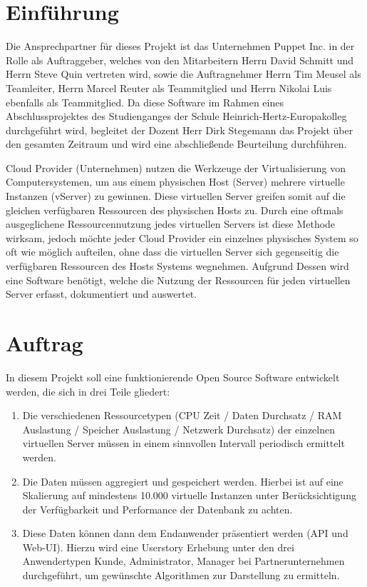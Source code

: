 \section{Einführung}

Die Ansprechpartner für dieses Projekt ist das Unternehmen Puppet Inc. in der
Rolle als Auftraggeber, welches von den Mitarbeitern Herrn David Schmitt und
Herrn Steve Quin vertreten wird, sowie die Auftragnehmer Herrn Tim Meusel als
Teamleiter, Herrn Marcel Reuter als Teammitglied und Herrn Nikolai Luis
ebenfalls als Teammitglied. Da diese Software im Rahmen eines
Abschlussprojektes des Studienganges der Schule Heinrich-Hertz-Europakolleg
durchgeführt wird, begleitet der Dozent Herr Dirk Stegemann das Projekt über
den gesamten Zeitraum und wird eine abschließende Beurteilung durchführen.

Cloud Provider (Unternehmen) nutzen die Werkzeuge der Virtualisierung von
Computersystemen, um aus einem physischen Host (Server) mehrere virtuelle
Instanzen (vServer) zu gewinnen. Diese virtuellen Server greifen somit auf die
gleichen verfügbaren Ressourcen des physischen Hosts zu. Durch eine oftmals
ausgeglichene Ressourcennutzung jedes virtuellen Servers ist diese Methode
wirksam, jedoch möchte jeder Cloud Provider ein einzelnes physisches System so
oft wie möglich aufteilen, ohne dass die virtuellen Server sich gegenseitig
die verfügbaren Ressourcen des Hosts Systems wegnehmen. Aufgrund Dessen wird
eine Software benötigt, welche die Nutzung der Ressourcen für jeden virtuellen
Server erfasst, dokumentiert und auswertet.


\section{Auftrag}

In diesem Projekt soll eine funktionierende Open Source Software entwickelt
werden, die sich in drei Teile gliedert:
\begin{enumerate}
  \item Die verschiedenen Ressourcetypen (CPU Zeit / Daten Durchsatz / RAM
    Auslastung / Speicher Auslastung / Netzwerk Durchsatz) der einzelnen
    virtuellen Server müssen in einem sinnvollen Intervall periodisch
    ermittelt werden.
  \item Die Daten müssen aggregiert und gespeichert werden. Hierbei ist auf
    eine Skalierung auf mindestens 10.000 virtuelle Instanzen unter
    Berücksichtigung der Verfügbarkeit und Performance der Datenbank zu achten.
  \item Diese Daten können dann dem Endanwender präsentiert werden (API und
    Web-UI). Hierzu wird eine Userstory Erhebung unter den drei Anwendertypen
    Kunde, Administrator, Manager bei Partnerunternehmen durchgeführt,
    um gewünschte Algorithmen zur Darstellung zu ermitteln.
\end{enumerate}

